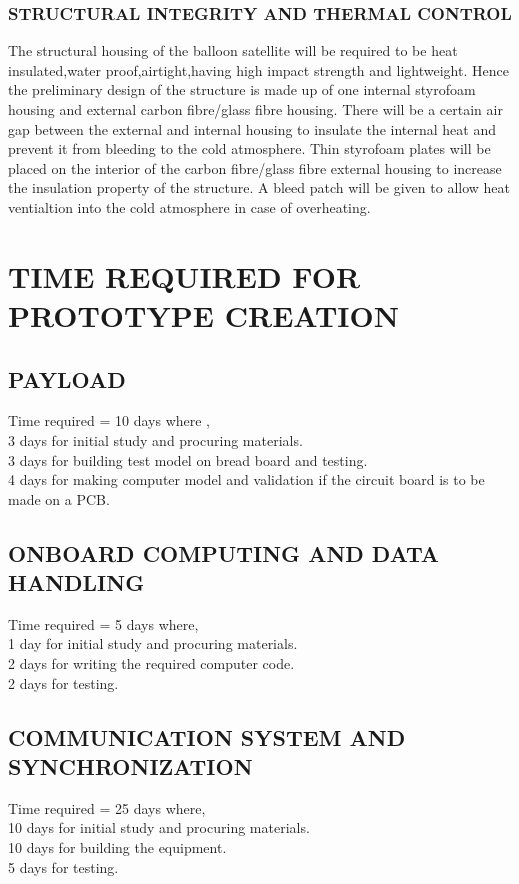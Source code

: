 \documentclass[9pt]{IEEEtran}
\begin{document}
\subsubsection{STRUCTURAL INTEGRITY AND THERMAL CONTROL}
	The structural housing of the balloon satellite will be required to be heat insulated,water proof,airtight,having high impact strength
	and lightweight. Hence the preliminary design of the structure is made up of one internal styrofoam housing and external carbon fibre/glass fibre
	housing.
	There will be a certain air gap between the external and internal housing to insulate the internal heat and prevent it from bleeding to the
	cold atmosphere. Thin styrofoam plates will be placed on the interior of the carbon fibre/glass fibre external housing to increase the insulation
	property of the structure.
	A bleed patch will be given to allow heat ventialtion into the cold atmosphere in case of overheating.


\section{TIME REQUIRED FOR PROTOTYPE CREATION}
\subsection{PAYLOAD}
Time required = 10 days where ,
\\ 3 days for initial study and procuring materials.
\\ 3 days for building test model on bread board and testing.
\\ 4 days for making computer model and validation if the circuit board is to
		be made on a PCB.

\subsection{ONBOARD COMPUTING AND DATA HANDLING}
Time required = 5 days where,
\\ 1 day for initial study and procuring materials.
\\ 2 days for writing the required computer code.
\\ 2 days for testing.
\subsection{COMMUNICATION SYSTEM AND SYNCHRONIZATION}
Time required = 25 days where,
\\ 10 days for initial study and procuring materials.
\\ 10 days for building the equipment.
\\ 5 days for testing.
\end{document}
